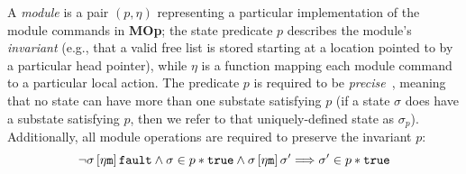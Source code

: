 A \emph{module} is a pair $(p,\eta)$ representing a particular implementation of the module commands in \textbf{MOp}; the 
state predicate $p$ describes the module's \emph{invariant} (e.g., that a valid free list is stored starting at a location
pointed to by a particular head pointer), while $\eta$ is a function mapping each module command to a particular local action.
The predicate $p$ is required to be \emph{precise}~\cite{oyr04}, meaning that no state can have more than one substate satisfying $p$ (if 
a state $\sigma$ does have a substate satisfying $p$, then we refer to that uniquely-defined state as $\sigma_p$). Additionally, 
all module operations are required to preserve the invariant $p$:
\[\lnot \sigma \left[\eta\texttt{m}\right] \text{\tt{fault}} \land \sigma \in p*\text{\tt{true}} \land \sigma \left[\eta\texttt{m}\right] \sigma'
\Longrightarrow \sigma' \in p*\text{\tt{true}}\]

\begin{comment}
\ifextended
The big-step operational semantics of our machine are presented in Figure~\ref{bigopsem}. The semantics is parameterized by
a module $(p,\eta)$, and is identical to the instrumented semantics defined in~\cite{filipovic10}. The main difference
between this semantics and a standard one is that there is a special kind of faulting called ``access violation.'' Intuitively, an access
violation occurs when a client operation's execution depends on the module's portion of memory. More formally, it 
occurs when the client operation executes safely on a state where the module's memory is present (i.e., a state satisfying
$p*\true$), but faults when that memory is removed from the state.

Note that, in the semantics, we use metavariable $\sigma$ for a program state, $\tau$ for either a state or $\fault$, and $\rho$
for either a state, $\fault$, or $\av$ (access violation).
\end{comment}


